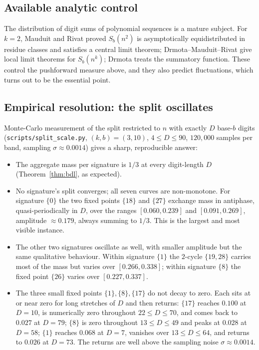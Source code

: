 \documentclass[11pt]{article}
\theoremstyle{definition}
\theoremstyle{remark}
\begin{document}
\subsection{Available analytic control}

The distribution of digit sums of polynomial sequences is a mature subject. For $k=2$, Mauduit and Rivat \cite{mauduit-rivat} proved $S_b(n^2)$ is asymptotically equidistributed in residue classes and satisfies a central limit theorem; Drmota--Mauduit--Rivat \cite{dmr} give local limit theorems for $S_b(n^k)$; Drmota \cite{drmota-poly} treats the summatory function. These control the pushforward measure above, and they also predict fluctuations, which turns out to be the essential point.

\subsection{Empirical resolution: the split oscillates}

Monte-Carlo measurement of the split restricted to $n$ with exactly $D$ base-$b$ digits (\texttt{scripts/split\_scale.py}, $(k,b) = (3,10)$, $4 \le D \le 90$, $120{,}000$ samples per band, sampling $\sigma \approx 0.0014$) gives a sharp, reproducible answer:
\begin{itemize}
\item The aggregate mass per signature is $1/3$ at every digit-length $D$ (Theorem~\ref{thm:bdl}, as expected).
\item No signature's split converges; all seven curves are non-monotone. For signature $\{0\}$ the two fixed points $\{18\}$ and $\{27\}$ exchange mass in antiphase, quasi-periodically in $D$, over the ranges $[0.060,0.239]$ and $[0.091,0.269]$, amplitude $\approx 0.179$, always summing to $1/3$. This is the largest and most visible instance.
\item The other two signatures oscillate as well, with smaller amplitude but the same qualitative behaviour. Within signature $\{1\}$ the $2$-cycle $\{19,28\}$ carries most of the mass but varies over $[0.266,0.338]$; within signature $\{8\}$ the fixed point $\{26\}$ varies over $[0.227,0.337]$.
\item The three small fixed points $\{1\},\{8\},\{17\}$ do not decay to zero. Each sits at or near zero for long stretches of $D$ and then returns: $\{17\}$ reaches $0.100$ at $D = 10$, is numerically zero throughout $22 \le D \le 70$, and comes back to $0.027$ at $D = 79$; $\{8\}$ is zero throughout $13 \le D \le 49$ and peaks at $0.028$ at $D = 58$; $\{1\}$ reaches $0.068$ at $D = 7$, vanishes over $13 \le D \le 64$, and returns to $0.026$ at $D = 73$. The returns are well above the sampling noise $\sigma \approx 0.0014$.
\end{itemize}
\end{document}
